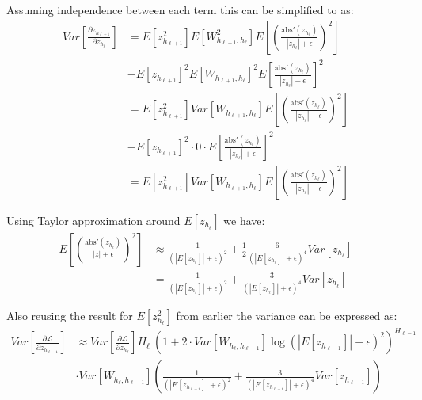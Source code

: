 Assuming independence between each term this can be simplified to as:
\begin{equation}
\begin{aligned}
Var\left[\frac{\partial z_{h_{\ell+1}}}{\partial z_{h_\ell}}\right] &= E[z_{h_{\ell+1}}^2] E[W_{h_{\ell+1}, h_{\ell}}^2] E\left[\left( \frac{\mathrm{abs}'(z_{h_{\ell}})}{|z_{h_{\ell}}| + \epsilon}\right)^2\right] \\
&- E[z_{h_{\ell+1}}]^2 E[W_{h_{\ell+1}, h_{\ell}}]^2 E\left[ \frac{\mathrm{abs}'(z_{h_{\ell}})}{|z_{h_{\ell}}| + \epsilon}\right]^2 \\
&= E[z_{h_{\ell+1}}^2] Var[W_{h_{\ell+1}, h_{\ell}}] E\left[\left( \frac{\mathrm{abs}'(z_{h_{\ell}})}{|z_{h_{\ell}}| + \epsilon}\right)^2\right] \\
&- E[z_{h_{\ell+1}}]^2 \cdot 0 \cdot E\left[ \frac{\mathrm{abs}'(z_{h_{\ell}})}{|z_{h_{\ell}}| + \epsilon}\right]^2 \\
&= E[z_{h_{\ell+1}}^2] Var[W_{h_{\ell+1}, h_{\ell}}] E\left[\left( \frac{\mathrm{abs}'(z_{h_{\ell}})}{|z_{h_{\ell}}| + \epsilon}\right)^2\right]
\end{aligned}
\end{equation}

Using Taylor approximation around $E[z_{h_{\ell}}]$ we have:
\begin{equation}
\begin{aligned}
E\left[\left(\frac{\mathrm{abs}'(z_{h_{\ell}})}{|z| + \epsilon}\right)^2\right] &\approx\frac{1}{\left(|E[z_{h_{\ell}}]| + \epsilon\right)^2} + \frac{1}{2} \frac{6}{\left(|E[z_{h_{\ell}}]| + \epsilon\right)^4} Var[z_{h_{\ell}}] \\
&= \frac{1}{\left(|E[z_{h_{\ell}}]| + \epsilon\right)^2} + \frac{3}{\left(|E[z_{h_{\ell}}]| + \epsilon\right)^4} Var[z_{h_{\ell}}]
\end{aligned}
\end{equation}

Also reusing the result for $E[z_{h_\ell}^2]$ from earlier the variance can be expressed as:
\begin{equation}
\begin{aligned}
Var\left[\frac{\partial \mathcal{L}}{\partial z_{h_{\ell-1}}}\right] &\approx Var\left[\frac{\partial \mathcal{L}}{\partial z_{h_{\ell}}}\right] H_{\ell}\ \left(1 + 2 \cdot Var[W_{h_{\ell}, h_{\ell-1}}] \log(|E[z_{h_{\ell-1}}]| + \epsilon)^2\right)^{H_{\ell-1}} \\
&\cdot Var[W_{h_{\ell}, h_{\ell-1}}] \left(\frac{1}{\left(|E[z_{h_{\ell-1}}]| + \epsilon\right)^2} + \frac{3}{\left(|E[z_{h_{\ell-1}}]| + \epsilon\right)^4} Var[z_{h_{\ell-1}}]\right)
\end{aligned}
\end{equation}

